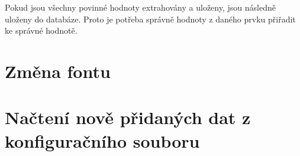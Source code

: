 \par
Pokud jsou všechny povinné hodnoty extrahovány a uloženy, jsou následně uloženy do databáze. Proto je potřeba správně hodnoty z daného prvku přiřadit ke správné hodnotě.

\section{Změna fontu}

\section{Načtení nově přidaných dat z konfiguračního souboru}
